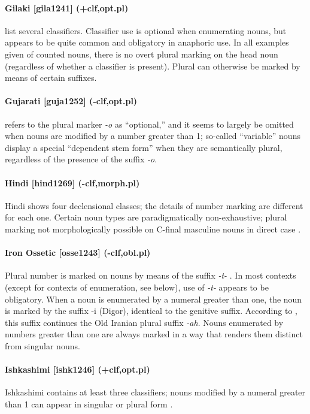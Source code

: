 \paragraph{Gilaki [gila1241] (+clf,opt.pl)}
\citet{Rastorguevaetal2012} list several classifiers. Classifier use is optional when enumerating nouns, but appears to be quite common and obligatory in anaphoric use. In all examples given of counted nouns, there is no overt plural marking on the head noun (regardless of whether a classifier is present). Plural can otherwise be marked by means of certain suffixes.
\paragraph{Gujarati [guja1252] (-clf,opt.pl)}
\citet[66--7]{Cardona1965} refers to the plural marker {\it -o} as ``optional,'' and it seems to largely be omitted when nouns are modified by a number greater than 1; so-called ``variable'' nouns display a special ``dependent stem form'' when they are semantically plural, regardless of the presence of the suffix {\it -o}.
\paragraph{Hindi [hind1269] (-clf,morph.pl)}
Hindi shows four declensional classes; the details of number marking are different for each one. Certain noun types are paradigmatically non-exhaustive; plural marking not morphologically possible on C-final masculine nouns in direct case \citep{Oberlies2005}.
\paragraph{Iron Ossetic [osse1243] (-clf,obl.pl)}
Plural number is marked on nouns by means of the suffix {\it -t-} \citep[117]{Thordarson2009}. In most contexts (except for contexts of enumeration, see below), use of {\it -t-} appears to be obligatory. When a noun is enumerated by a numeral greater than one, the noun is marked by the suffix -i (Digor), identical to the genitive suffix. According to \citet[132]{Thordarson2009}, this suffix continues the Old Iranian plural suffix {\it *-ah}. Nouns enumerated by numbers greater than one are always marked in a way that renders them distinct from singular nouns.
\paragraph{Ishkashimi [ishk1246] (+clf,opt.pl)}
Ishkashimi contains at least three classifiers; nouns modified by a numeral greater than 1 can appear in singular or plural form \citep[50]{Paxalina1959}.

